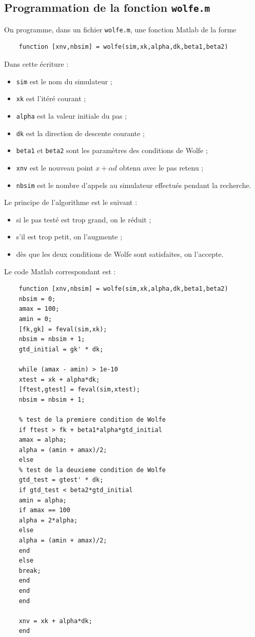 \documentclass[a4paper,12pt]{article}
\begin{document}
	\subsection{Programmation de la fonction \texttt{wolfe.m}}
	
	On programme, dans un fichier \texttt{wolfe.m}, une fonction Matlab de la forme
	\begin{verbatim}
	function [xnv,nbsim] = wolfe(sim,xk,alpha,dk,beta1,beta2)
	\end{verbatim}
	
	Dans cette écriture :
	\begin{itemize}
		\item \texttt{sim} est le nom du simulateur ;
		\item \texttt{xk} est l'itéré courant ;
		\item \texttt{alpha} est la valeur initiale du pas ;
		\item \texttt{dk} est la direction de descente courante ;
		\item \texttt{beta1} et \texttt{beta2} sont les paramètres des conditions de Wolfe ;
		\item \texttt{xnv} est le nouveau point $x+\alpha d$ obtenu avec le pas retenu ;
		\item \texttt{nbsim} est le nombre d'appels au simulateur effectués pendant la recherche.
	\end{itemize}
	
	Le principe de l'algorithme est le suivant :
	\begin{itemize}
		\item si le pas testé est trop grand, on le réduit ;
		\item s'il est trop petit, on l'augmente ;
		\item dès que les deux conditions de Wolfe sont satisfaites, on l'accepte.
	\end{itemize}
	
	Le code Matlab correspondant est :
	
	\begin{verbatim}
	function [xnv,nbsim] = wolfe(sim,xk,alpha,dk,beta1,beta2)
	nbsim = 0;
	amax = 100;
	amin = 0;
	[fk,gk] = feval(sim,xk);
	nbsim = nbsim + 1;
	gtd_initial = gk' * dk;
	
	while (amax - amin) > 1e-10
	xtest = xk + alpha*dk;
	[ftest,gtest] = feval(sim,xtest);
	nbsim = nbsim + 1;
	
	% test de la premiere condition de Wolfe
	if ftest > fk + beta1*alpha*gtd_initial
	amax = alpha;
	alpha = (amin + amax)/2;
	else
	% test de la deuxieme condition de Wolfe
	gtd_test = gtest' * dk;
	if gtd_test < beta2*gtd_initial
	amin = alpha;
	if amax == 100
	alpha = 2*alpha;
	else
	alpha = (amin + amax)/2;
	end
	else
	break;
	end
	end
	end
	
	xnv = xk + alpha*dk;
	end
	\end{verbatim}
	
\end{document}

